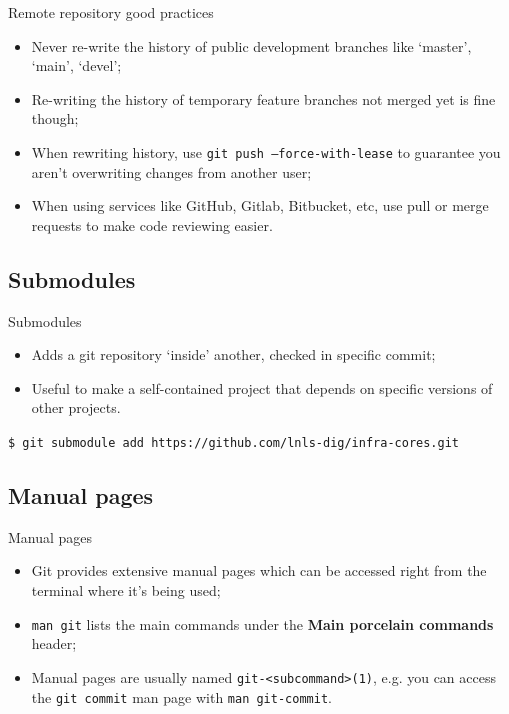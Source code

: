 \documentclass{beamer}
\begin{document}
\begin{frame}{Remote repository good practices}
  \begin{itemize}
    \item Never re-write the history of public development branches like `master', `main', `devel';
    \item Re-writing the history of temporary feature branches not merged yet is fine though;
    \item When rewriting history, use \texttt{git push --force-with-lease} to guarantee you aren't overwriting changes from another user;
    \item When using services like GitHub, Gitlab, Bitbucket, etc, use pull or merge requests to make code reviewing easier.
  \end{itemize}
\end{frame}

\subsection{Submodules}
\begin{frame}{Submodules}
  \begin{itemize}
    \item Adds a git repository `inside' another, checked in specific commit;
    \item Useful to make a self-contained project that depends on specific versions of other projects.
  \end{itemize}
  \begin{block}{}
    \texttt{\$ git submodule add https://github.com/lnls-dig/infra-cores.git}
  \end{block}
\end{frame}

\subsection{Manual pages}
\begin{frame}{Manual pages}
  \begin{itemize}
    \item Git provides extensive manual pages which can be accessed right from the terminal where it's being used;
    \item \texttt{man git} lists the main commands under the \textbf{Main porcelain commands} header;
    \item Manual pages are usually named \texttt{git-<subcommand>(1)}, e.g. you can access the \texttt{git commit} man page with \texttt{man git-commit}.
  \end{itemize}
\end{frame}
\end{document}
